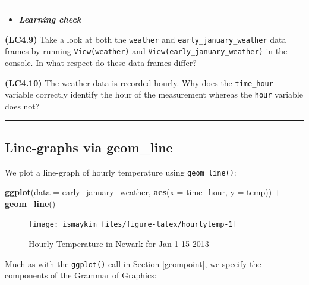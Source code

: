 \documentclass[]{tufte-book}
\newenvironment{Shaded}{\begin{snugshade}}{\end{snugshade}}
\newcommand{\KeywordTok}[1]{\textcolor[rgb]{0.13,0.29,0.53}{\textbf{{#1}}}}
\newcommand{\DataTypeTok}[1]{\textcolor[rgb]{0.13,0.29,0.53}{{#1}}}
\newcommand{\StringTok}[1]{\textcolor[rgb]{0.31,0.60,0.02}{{#1}}}
\newcommand{\NormalTok}[1]{{#1}}
\let\oldrule=\rule
\renewcommand{\rule}[1]{\oldrule{\linewidth}}
\newenvironment{rmdblock}[1]
  {\begin{shaded*}
  \begin{itemize}
  \renewcommand{\labelitemi}{
    \raisebox{-.7\height}[0pt][0pt]{
    }
  }
  \item
  }
  {
  \end{itemize}
  \end{shaded*}
  }
\newenvironment{learncheck}
  {\begin{rmdblock}{warning}}
  {\end{rmdblock}}
\begin{document}
\begin{center}\rule{0.5\linewidth}{\linethickness}\end{center}

\begin{learncheck}
\textbf{\emph{Learning check}}
\end{learncheck}

\textbf{(LC4.9)} Take a look at both the \texttt{weather} and
\texttt{early\_january\_weather} data frames by running
\texttt{View(weather)} and \texttt{View(early\_january\_weather)} in the
console. In what respect do these data frames differ?

\textbf{(LC4.10)} The weather data is recorded hourly. Why does the
\texttt{time\_hour} variable correctly identify the hour of the
measurement whereas the \texttt{hour} variable does not?

\begin{center}\rule{0.5\linewidth}{\linethickness}\end{center}

\subsection{Line-graphs via geom\_line}\label{geomline}

We plot a line-graph of hourly temperature using \texttt{geom\_line()}:

\begin{Shaded}
\begin{Highlighting}[]
\KeywordTok{ggplot}\NormalTok{(}\DataTypeTok{data =} \NormalTok{early_january_weather, }\KeywordTok{aes}\NormalTok{(}\DataTypeTok{x =} \NormalTok{time_hour, }\DataTypeTok{y =} \NormalTok{temp)) +}
\StringTok{  }\KeywordTok{geom_line}\NormalTok{()}
\end{Highlighting}
\end{Shaded}

\begin{figure}

{\centering \texttt{[image: ismaykim\_files/figure-latex/hourlytemp-1]} 

}

\caption[Hourly Temperature in Newark for Jan 1-15 2013]{Hourly Temperature in Newark for Jan 1-15 2013}\label{fig:hourlytemp}
\end{figure}

Much as with the \texttt{ggplot()} call in Section \ref{geompoint}, we
specify the components of the Grammar of Graphics:
\end{document}
